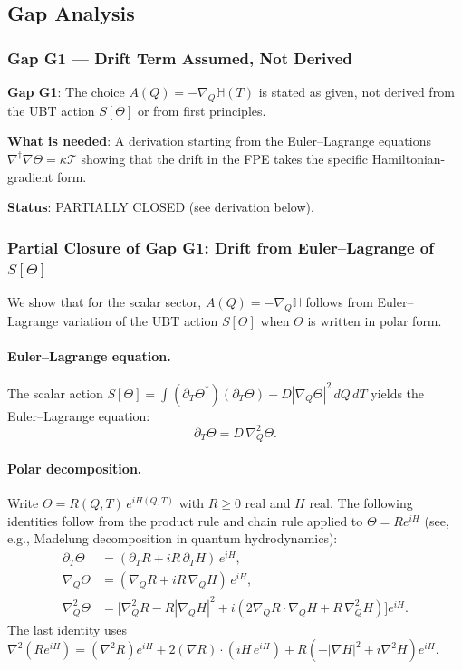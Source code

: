 \documentclass[12pt]{article}
\theoremstyle{definition}
\theoremstyle{remark}
\begin{document}
\subsection{Gap Analysis}

\subsubsection{Gap G1 — Drift Term Assumed, Not Derived}

\begin{gapbox}
\textbf{Gap G1}: The choice $A(Q) = -\nabla_Q\mathbb{H}(T)$ is stated as given, not derived from the UBT action $S[\Theta]$ or from first principles.

\textbf{What is needed}: A derivation starting from the Euler--Lagrange equations
$\nabla^\dagger\nabla\Theta = \kappa\mathcal{T}$ showing that the drift in the
FPE takes the specific Hamiltonian-gradient form.

\textbf{Status}: PARTIALLY CLOSED (see derivation below).
\end{gapbox}

\subsubsection{Partial Closure of Gap G1: Drift from Euler--Lagrange of $S[\Theta]$}
\label{subsubsec:gap_g1_partial}

We show that for the scalar sector, $A(Q) = -\nabla_Q\mathbb{H}$ follows from
Euler--Lagrange variation of the UBT action $S[\Theta]$ when $\Theta$ is written
in polar form.

\paragraph{Euler--Lagrange equation.}
The scalar action $S[\Theta] = \int (\partial_T \Theta^*)(\partial_T \Theta) - D|\nabla_Q \Theta|^2\, dQ\, dT$ yields
the Euler--Lagrange equation:
\begin{equation}
  \partial_T \Theta = D\,\nabla_Q^2\Theta.
  \label{eq:el_scalar}
\end{equation}

\paragraph{Polar decomposition.}
Write $\Theta = R(Q,T)\,e^{iH(Q,T)}$ with $R \geq 0$ real and $H$ real.
The following identities follow from the product rule and chain rule applied to $\Theta = R e^{iH}$
(see, e.g., Madelung decomposition in quantum hydrodynamics):
\begin{align}
  \partial_T\Theta &= (\partial_T R + iR\,\partial_T H)\,e^{iH}, \\
  \nabla_Q \Theta  &= (\nabla_Q R + iR\,\nabla_Q H)\,e^{iH}, \\
  \nabla_Q^2\Theta &= \bigl[\nabla_Q^2 R - R|\nabla_Q H|^2
                      + i(2\nabla_Q R\cdot\nabla_Q H + R\,\nabla_Q^2 H)\bigr]e^{iH}.
\end{align}
The last identity uses $\nabla^2(R e^{iH}) = (\nabla^2 R)e^{iH} + 2(\nabla R)\cdot(iH\,e^{iH}) + R(-|\nabla H|^2 + i\nabla^2 H)e^{iH}$.
\end{document}

